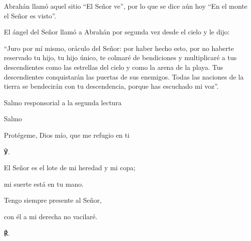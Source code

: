 			\begin{readbody}Abrahán llamó aquel sitio “El Señor ve”, por lo que se dice aún hoy “En el monte el Señor es visto”. \end{readbody}
			
			\begin{readbody}El ángel del Señor llamó a Abrahán por segunda vez desde el cielo y le dijo: \end{readbody}
			
			\begin{readtalk}“Juro por mí mismo, oráculo del Señor: por haber hecho esto, por no haberte reservado tu hijo, tu hijo único, te colmaré de bendiciones y multiplicaré a tus descendientes como las estrellas del cielo y como la arena de la playa. Tus descendientes conquistarán las puertas de sus enemigos. Todas las naciones de la tierra se bendecirán con tu descendencia, porque has escuchado mi voz”.\end{readtalk}
			
			\begin{readtitle}Salmo responsorial a la segunda lectura\end{readtitle}
			
			\begin{readbook}Salmo \end{readbook}
			
			\begin{readtheme}Protégeme, Dios mío, que me refugio en ti\end{readtheme}
			
			\begin{readbody}\begin{readred}℣.\end{readred} El Señor es el lote de mi heredad y mi copa; \end{readbody}
			
			\begin{readtabbed}mi suerte está en tu mano. \end{readtabbed}
			
			\begin{readtabbed}Tengo siempre presente al Señor, \end{readtabbed}
			
			\begin{readtabbed}con él a mi derecha no vacilaré. \begin{readred}℟.\end{readred}\end{readtabbed}
			
